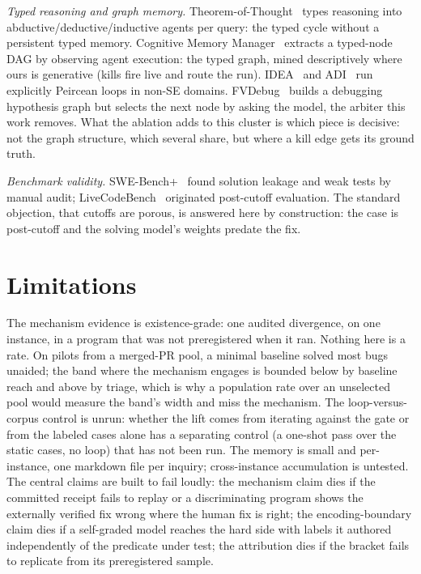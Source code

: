 \documentclass[sigconf,review,anonymous]{acmart}
\begin{document}
\emph{Typed reasoning and graph memory.} Theorem-of-Thought~\cite{tot} types reasoning into abductive/deductive/inductive agents per query: the typed cycle without a persistent typed memory. Cognitive Memory Manager~\cite{cmm} extracts a typed-node DAG by observing agent execution: the typed graph, mined descriptively where ours is generative (kills fire live and route the run). IDEA~\cite{idea} and ADI~\cite{adi} run explicitly Peircean loops in non-SE domains. FVDebug~\cite{fvdebug} builds a debugging hypothesis graph but selects the next node by asking the model, the arbiter this work removes. What the ablation adds to this cluster is which piece is decisive: not the graph structure, which several share, but where a kill edge gets its ground truth.

\emph{Benchmark validity.} SWE-Bench+~\cite{swebenchplus} found solution leakage and weak tests by manual audit; LiveCodeBench~\cite{livecodebench} originated post-cutoff evaluation. The standard objection, that cutoffs are porous, is answered here by construction: the case is post-cutoff and the solving model's weights predate the fix.

\section{Limitations}\label{sec:limits}

The mechanism evidence is existence-grade: one audited divergence, on one instance, in a program that was not preregistered when it ran. Nothing here is a rate. On pilots from a merged-PR pool, a minimal baseline solved most bugs unaided; the band where the mechanism engages is bounded below by baseline reach and above by triage, which is why a population rate over an unselected pool would measure the band's width and miss the mechanism. The loop-versus-corpus control is unrun: whether the lift comes from iterating against the gate or from the labeled cases alone has a separating control (a one-shot pass over the static cases, no loop) that has not been run. The memory is small and per-instance, one markdown file per inquiry; cross-instance accumulation is untested. The central claims are built to fail loudly: the mechanism claim dies if the committed receipt fails to replay or a discriminating program shows the externally verified fix wrong where the human fix is right; the encoding-boundary claim dies if a self-graded model reaches the hard side with labels it authored independently of the predicate under test; the attribution dies if the bracket fails to replicate from its preregistered sample.
\end{document}
